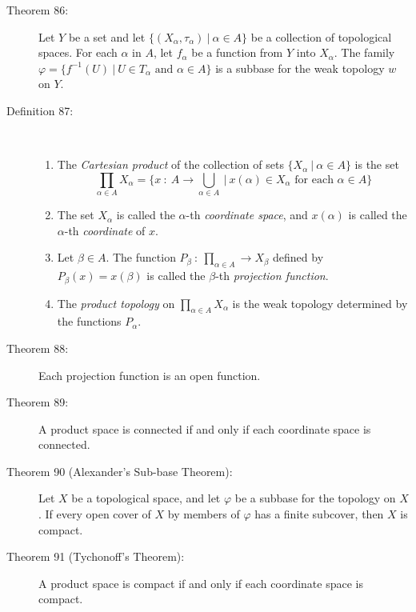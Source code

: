 \documentclass{article}
\begin{document}
\begin{description}
  \item[Theorem 86:] Let $Y$ be a set and let $\{ (X_{\alpha}, \tau _{\alpha}) \ \vert \ \alpha \in A \}$ be a collection of topological spaces. For each $\alpha$ in $A$, let $f_{\alpha}$ be a function from $Y$ into $X_{\alpha}$. The family $\varphi = \{ f^{-1}(U) \ \vert \ U \in T_{\alpha} \text{ and } \alpha \in A \}$ is a subbase for the weak topology $w$ on $Y$.

  \item[Definition 87:] $\ $
    \begin{enumerate}[\hspace{1cm}1.]
      \item The \emph{Cartesian product} of the collection of sets $\{ X_{\alpha} \ \vert \ \alpha \in A \}$ is the set
        \begin{equation*}
        \prod_{\alpha \in A} X_{\alpha} = \{ x \ : \ A \rightarrow \bigcup_{\alpha \in A} \ \vert \ x(\alpha) \in X_{\alpha} \text{ for each } \alpha \in A \}
        \end{equation*}
      \item The set $X_{\alpha}$ is called the $\alpha$-th \emph{coordinate space}, and $x(\alpha)$ is called the $\alpha$-th \emph{coordinate} of $x$.
      \item Let $\beta \in A$. The function $P_{\beta} \ : \ \prod_{\alpha \in A} \rightarrow X_{\beta}$ defined by $P_{\beta}(x) = x(\beta)$ is called the $\beta$-th \emph{projection function}.
      \item The \emph{product topology} on $\prod_{\alpha \in A} X_{\alpha}$ is the weak topology determined by the functions $P_{\alpha}$.
    \end{enumerate}

  \item[Theorem 88:] Each projection function is an open function.

  \item[Theorem 89:] A product space is connected if and only if each coordinate space is connected.

  \item[Theorem 90 (Alexander's Sub-base Theorem):] Let $X$ be a topological space, and let $\varphi$ be a subbase for the topology on $X$. If every open cover of $X$ by members of $\varphi$ has a finite subcover, then $X$ is compact.

  \item[Theorem 91 (Tychonoff's Theorem):] A product space is compact if and only if each coordinate space is compact.

\end{description}
\end{document}
